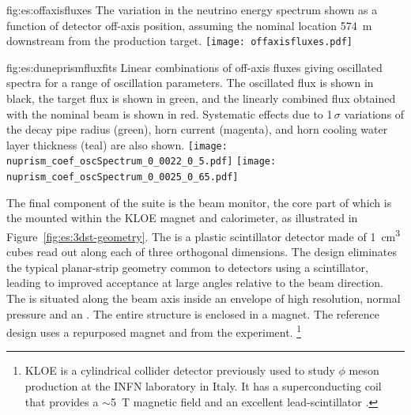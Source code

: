 \begin{dunefigure}{fig:es:offaxisfluxes}
{The variation in the neutrino energy spectrum shown as a function of detector off-axis position, assuming the nominal  location 574~m downstream from the production target.}
\texttt{[image: offaxisfluxes.pdf]}
\end{dunefigure}
\begin{dunefigure}{fig:es:duneprismfluxfits}
{Linear combinations of off-axis fluxes giving  oscillated spectra for a range of oscillation parameters. The   oscillated flux is shown in black, the target flux is shown in green, and the linearly combined flux obtained with the nominal beam  is shown in red. Systematic effects due to 1$\,\sigma$ variations of the decay pipe radius (green), horn current (magenta), and horn cooling water layer thickness (teal) are also shown.}
	\texttt{[image: nuprism\_coef\_oscSpectrum\_0\_0022\_0\_5.pdf]}
	\texttt{[image: nuprism\_coef\_oscSpectrum\_0\_0025\_0\_65.pdf]}
\end{dunefigure}

The final component of the   suite is the beam monitor, %
the core part of which is the  mounted within the KLOE magnet and calorimeter, as illustrated in Figure~\ref{fig:es:3dst-geometry}.  The  is a plastic scintillator detector made of \SI{1}{\cubic\centi\meter} cubes read out along each of three orthogonal dimensions.  The design eliminates the typical planar-strip geometry common to detectors using a scintillator, leading to improved acceptance at large angles relative to the beam direction.  The  is situated along the beam axis inside an envelope of high resolution, normal pressure  and an .  The entire structure is enclosed in a magnet. The reference design uses a repurposed magnet and  from the  experiment. \footnote{KLOE is a cylindrical collider detector previously used to study $\phi$ meson production at the INFN laboratory in Italy.  It has a superconducting coil that provides a $\sim$5~T magnetic field and an excellent lead-scintillator  \cite{Franzini:2006aa}.} %


